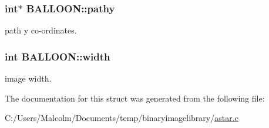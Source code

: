 \subsubsection[{\texorpdfstring{pathy}{pathy}}]{\setlength{\rightskip}{0pt plus 5cm}int$\ast$ B\+A\+L\+L\+O\+O\+N\+::pathy}\hypertarget{struct_b_a_l_l_o_o_n_a27c1b2f655569a48a3dab4efc4d176cb}{}\label{struct_b_a_l_l_o_o_n_a27c1b2f655569a48a3dab4efc4d176cb}
path y co-\/ordinates. 
\subsubsection[{\texorpdfstring{width}{width}}]{\setlength{\rightskip}{0pt plus 5cm}int B\+A\+L\+L\+O\+O\+N\+::width}\hypertarget{struct_b_a_l_l_o_o_n_a3aa32ca888a9814d614a950ea0604dad}{}\label{struct_b_a_l_l_o_o_n_a3aa32ca888a9814d614a950ea0604dad}
image width. 

The documentation for this struct was generated from the following file\+:\begin{DoxyCompactItemize}
\item 
C\+:/\+Users/\+Malcolm/\+Documents/temp/binaryimagelibrary/\hyperlink{astar_8c}{astar.\+c}\end{DoxyCompactItemize}
